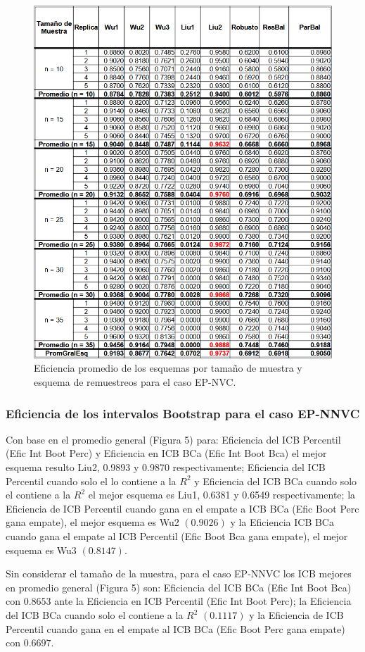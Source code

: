 \begin{figure}[H] 
	\centering 
	\includegraphics[width=0.70\linewidth]{img/EP_NVC_Efic_Esq.png} 
	\caption{Eficiencia promedio de los esquemas por tamaño de muestra y esquema de remuestreos para el caso EP-NVC.} 
	\label{fig:EP_NVC_Esq}
\end{figure}

\FloatBarrier

\subsubsection{Eficiencia de los intervalos Bootstrap para el caso EP-NNVC}
Con base en el promedio general (Figura 5) para: Eficiencia del ICB Percentil (Efic Int Boot Perc) y Eficiencia en ICB BCa (Efic Int Boot Bca) el mejor esquema resulto Liu2, 0.9893 y 0.9870 respectivamente;
Eficiencia del ICB Percentil cuando solo el lo contiene a la $R^{2}$ y Eficiencia del ICB BCa cuando solo el contiene a la $R^{2}$ el mejor esquema es Liu1, 0.6381 y 0.6549 respectivamente; 
la Eficiencia de ICB Percentil cuando gana en el empate a ICB BCa (Efic Boot Perc gana empate), el mejor esquema es Wu2 $(0.9026)$ y la Eficiencia ICB BCa cuando gana el empate al ICB Percentil (Efic Boot Bca gana empate), el mejor esquema es Wu3 $(0.8147)$.
\vspace{.5cm}


Sin considerar el tamaño de la muestra, para el caso EP-NNVC los ICB mejores en promedio general  (Figura 5) son: Eficiencia del ICB BCa (Efic Int Boot Bca) con $0.8653$ ante la Eficiencia en ICB Percentil (Efic Int Boot Perc); la Eficiencia del ICB BCa cuando solo el contiene a la $R^{2}$ $(0.1117)$ y la Eficiencia de ICB Percentil cuando gana en el empate al ICB BCa (Efic Boot Perc gana empate) con $0.6697$.



